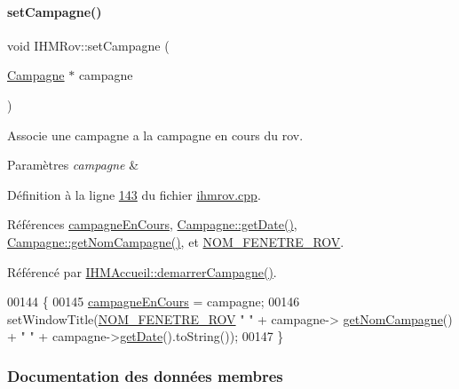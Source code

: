 \paragraph{\texorpdfstring{set\+Campagne()}{setCampagne()}}
{\footnotesize\ttfamily void I\+H\+M\+Rov\+::set\+Campagne (\begin{DoxyParamCaption}\item[{\hyperlink{class_campagne}{Campagne} $\ast$}]{campagne }\end{DoxyParamCaption})}



Associe une campagne a la campagne en cours du rov. 


\begin{DoxyParams}{Paramètres}
{\em campagne} & \\
\hline
\end{DoxyParams}


Définition à la ligne \hyperlink{ihmrov_8cpp_source_l00143}{143} du fichier \hyperlink{ihmrov_8cpp_source}{ihmrov.\+cpp}.



Références \hyperlink{ihmrov_8h_source_l00045}{campagne\+En\+Cours}, \hyperlink{campagne_8cpp_source_l00039}{Campagne\+::get\+Date()}, \hyperlink{campagne_8cpp_source_l00019}{Campagne\+::get\+Nom\+Campagne()}, et \hyperlink{ihmrov_8h_source_l00020}{N\+O\+M\+\_\+\+F\+E\+N\+E\+T\+R\+E\+\_\+\+R\+OV}.



Référencé par \hyperlink{ihmaccueil_8cpp_source_l00323}{I\+H\+M\+Accueil\+::demarrer\+Campagne()}.


\begin{DoxyCode}
00144 \{
00145     \hyperlink{class_i_h_m_rov_af0475e935531b7331f097ae13d07989b}{campagneEnCours} = campagne;
00146     setWindowTitle(\hyperlink{ihmrov_8h_aa7e4fcf0d5f67b5c84de425d1f4776ea}{NOM\_FENETRE\_ROV}  \textcolor{stringliteral}{" "} + campagne->
      \hyperlink{class_campagne_a99a682fcb8e5a3f8c2aff7a44eb2c930}{getNomCampagne}() + \textcolor{stringliteral}{" "} + campagne->\hyperlink{class_campagne_a319b5bb4ed2b0fc1a10fc4d099a7a6d2}{getDate}().toString());
00147 \}
\end{DoxyCode}


\subsubsection{Documentation des données membres}
\mbox{\label{class_i_h_m_rov_a324be23537f48127c49b943aa439a978}} 

